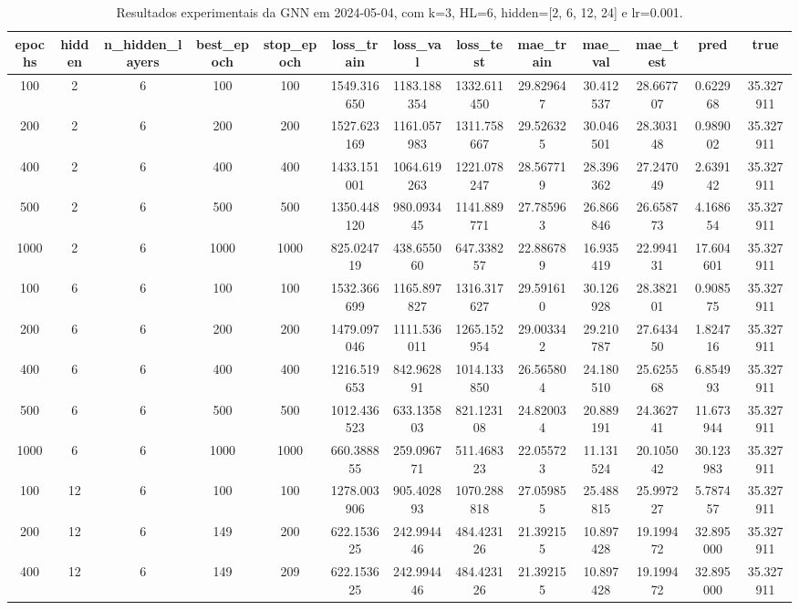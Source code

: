 \begin{table}[h]
\centering
\caption{Resultados experimentais da GNN em 2024-05-04, com k=3, HL=6, hidden=[2, 6, 12, 24] e lr=0.001.}
\label{tab:gnn_results_k3_hl6_d20240504}
\begin{tabular}{ccccccccccccc}
\toprule
epochs & hidden & n\_hidden\_layers & best\_epoch & stop\_epoch & loss\_train & loss\_val & loss\_test & mae\_train & mae\_val & mae\_test & pred & true \\
\midrule
100 & 2 & 6 & 100 & 100 & 1549.316650 & 1183.188354 & 1332.611450 & 29.829647 & 30.412537 & 28.667707 & 0.622968 & 35.327911 \\
200 & 2 & 6 & 200 & 200 & 1527.623169 & 1161.057983 & 1311.758667 & 29.526325 & 30.046501 & 28.303148 & 0.989002 & 35.327911 \\
400 & 2 & 6 & 400 & 400 & 1433.151001 & 1064.619263 & 1221.078247 & 28.567719 & 28.396362 & 27.247049 & 2.639142 & 35.327911 \\
500 & 2 & 6 & 500 & 500 & 1350.448120 & 980.093445 & 1141.889771 & 27.785963 & 26.866846 & 26.658773 & 4.168654 & 35.327911 \\
1000 & 2 & 6 & 1000 & 1000 & 825.024719 & 438.655060 & 647.338257 & 22.886789 & 16.935419 & 22.994131 & 17.604601 & 35.327911 \\
100 & 6 & 6 & 100 & 100 & 1532.366699 & 1165.897827 & 1316.317627 & 29.591610 & 30.126928 & 28.382101 & 0.908575 & 35.327911 \\
200 & 6 & 6 & 200 & 200 & 1479.097046 & 1111.536011 & 1265.152954 & 29.003342 & 29.210787 & 27.643450 & 1.824716 & 35.327911 \\
400 & 6 & 6 & 400 & 400 & 1216.519653 & 842.962891 & 1014.133850 & 26.565804 & 24.180510 & 25.625568 & 6.854993 & 35.327911 \\
500 & 6 & 6 & 500 & 500 & 1012.436523 & 633.135803 & 821.123108 & 24.820034 & 20.889191 & 24.362741 & 11.673944 & 35.327911 \\
1000 & 6 & 6 & 1000 & 1000 & 660.388855 & 259.096771 & 511.468323 & 22.055723 & 11.131524 & 20.105042 & 30.123983 & 35.327911 \\
100 & 12 & 6 & 100 & 100 & 1278.003906 & 905.402893 & 1070.288818 & 27.059855 & 25.488815 & 25.997227 & 5.787457 & 35.327911 \\
200 & 12 & 6 & 149 & 200 & 622.153625 & 242.994446 & 484.423126 & 21.392155 & 10.897428 & 19.199472 & 32.895000 & 35.327911 \\
400 & 12 & 6 & 149 & 209 & 622.153625 & 242.994446 & 484.423126 & 21.392155 & 10.897428 & 19.199472 & 32.895000 & 35.327911 \\

\end{tabular}
\end{table}
